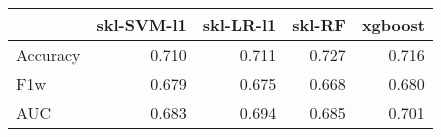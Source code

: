 \begin{tabular}{lrrrr}
\toprule
{} &  skl-SVM-l1 &  skl-LR-l1 &  skl-RF &  xgboost \\
\midrule
Accuracy &       0.710 &      0.711 &   0.727 &    0.716 \\
F1w      &       0.679 &      0.675 &   0.668 &    0.680 \\
AUC      &       0.683 &      0.694 &   0.685 &    0.701 \\
\bottomrule
\end{tabular}
